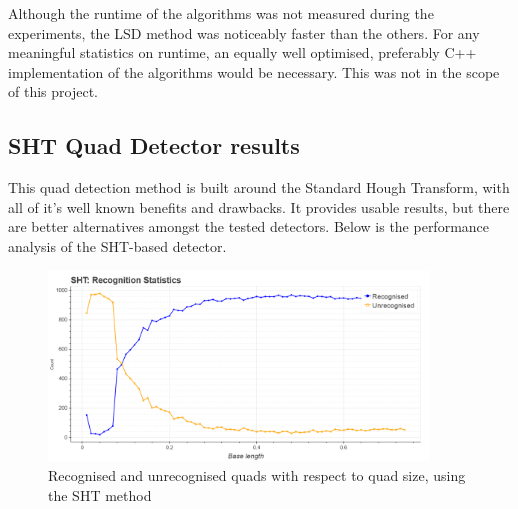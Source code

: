Although the runtime of the algorithms was not measured during the experiments, the LSD method was noticeably faster than the others.
For any meaningful statistics on runtime, an equally well optimised, preferably C++ implementation of the algorithms would be necessary.
This was not in the scope of this project.
\clearpage

\subsection{SHT Quad Detector results}

This quad detection method is built around the Standard Hough Transform, with all of it's well known benefits and drawbacks.
It provides usable results, but there are better alternatives amongst the tested detectors.
Below is the performance analysis of the SHT-based detector.

\begin{figure}[t]
	\centering
	\includegraphics[width=0.9\textwidth]{figures/plots/sht_rec_unrec_count.png}
	\caption{Recognised and unrecognised quads with respect to quad size, using the SHT method}
	\label{fig:shtRecCnt}
\end{figure}

